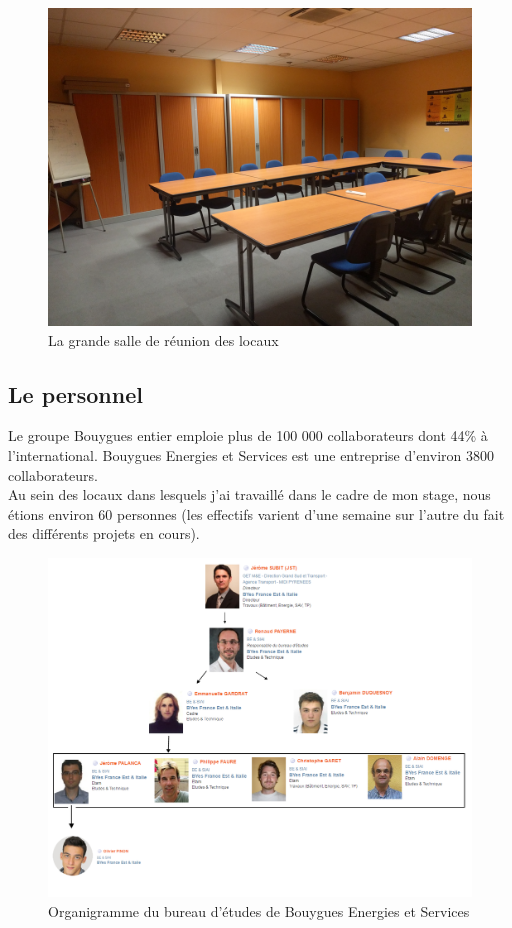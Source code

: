 \documentclass[a4paper]{article}
\begin{document}
    \begin{figure}[H]
        \centering
        \includegraphics[scale=0.05]{img/salleReu}
        \caption{La grande salle de réunion des locaux}
    \end{figure}

    \newpage

    \subsection{Le personnel}

    Le groupe Bouygues entier emploie plus de 100 000 collaborateurs dont 44\% à l’international. Bouygues Energies et Services est une entreprise d'environ 3800 collaborateurs. \\

    Au sein des locaux dans lesquels j'ai travaillé dans le cadre de mon stage, nous étions environ 60 personnes (les effectifs varient d'une semaine sur l'autre du fait des différents projets en cours).  \\

    \begin{figure}[H]
        \centering
        \includegraphics[scale=0.45]{img/Organigramme}
        \caption{Organigramme du bureau d'études de Bouygues Energies et Services}
    \end{figure}
\end{document}
